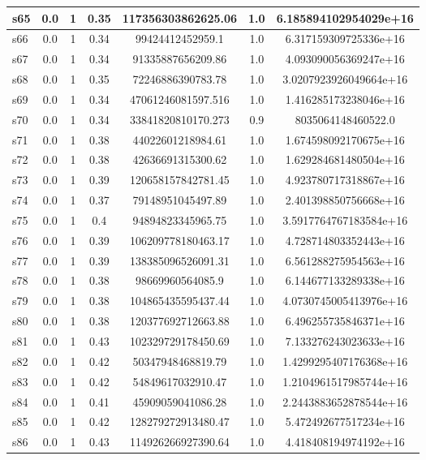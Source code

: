 \documentclass{article}
\begin{document}
\begin{tabular}{|l|c|c|c|c|c|c|}
\hline
s65 &0.0 & 1 & 0.35 & 117356303862625.06 & 1.0 & 6.185894102954029e+16\\
\hline
s66 &0.0 & 1 & 0.34 & 99424412452959.1 & 1.0 & 6.317159309725336e+16\\
\hline
s67 &0.0 & 1 & 0.34 & 91335887656209.86 & 1.0 & 4.093090056369247e+16\\
\hline
s68 &0.0 & 1 & 0.35 & 72246886390783.78 & 1.0 & 3.0207923926049664e+16\\
\hline
s69 &0.0 & 1 & 0.34 & 47061246081597.516 & 1.0 & 1.416285173238046e+16\\
\hline
s70 &0.0 & 1 & 0.34 & 33841820810170.273 & 0.9 & 8035064148460522.0\\
\hline
s71 &0.0 & 1 & 0.38 & 44022601218984.61 & 1.0 & 1.674598092170675e+16\\
\hline
s72 &0.0 & 1 & 0.38 & 42636691315300.62 & 1.0 & 1.629284681480504e+16\\
\hline
s73 &0.0 & 1 & 0.39 & 120658157842781.45 & 1.0 & 4.923780717318867e+16\\
\hline
s74 &0.0 & 1 & 0.37 & 79148951045497.89 & 1.0 & 2.401398850756668e+16\\
\hline
s75 &0.0 & 1 & 0.4 & 94894823345965.75 & 1.0 & 3.5917764767183584e+16\\
\hline
s76 &0.0 & 1 & 0.39 & 106209778180463.17 & 1.0 & 4.728714803352443e+16\\
\hline
s77 &0.0 & 1 & 0.39 & 138385096526091.31 & 1.0 & 6.561288275954563e+16\\
\hline
s78 &0.0 & 1 & 0.38 & 98669960564085.9 & 1.0 & 6.144677133289338e+16\\
\hline
s79 &0.0 & 1 & 0.38 & 104865435595437.44 & 1.0 & 4.0730745005413976e+16\\
\hline
s80 &0.0 & 1 & 0.38 & 120377692712663.88 & 1.0 & 6.496255735846371e+16\\
\hline
s81 &0.0 & 1 & 0.43 & 102329729178450.69 & 1.0 & 7.133276243023633e+16\\
\hline
s82 &0.0 & 1 & 0.42 & 50347948468819.79 & 1.0 & 1.4299295407176368e+16\\
\hline
s83 &0.0 & 1 & 0.42 & 54849617032910.47 & 1.0 & 1.2104961517985744e+16\\
\hline
s84 &0.0 & 1 & 0.41 & 45909059041086.28 & 1.0 & 2.2443883652878544e+16\\
\hline
s85 &0.0 & 1 & 0.42 & 128279272913480.47 & 1.0 & 5.472492677517234e+16\\
\hline
s86 &0.0 & 1 & 0.43 & 114926266927390.64 & 1.0 & 4.418408194974192e+16\\

\end{tabular}
\end{document}
